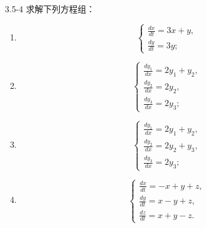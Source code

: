 \documentclass[UTF8,a4paper,11pt]{ctexart}
\begin{document}
\begin{problem}{3.5-4}
求解下列方程组：
  \begin{enumerate}[label=(\arabic*)]
    \item
    \[
    \begin{cases}
      \displaystyle \frac{dx}{dt}=3x+y,\\[5pt]
      \displaystyle \frac{dy}{dt}=3y;
    \end{cases}
    \]

    \item
    \[
    \begin{cases}
      \displaystyle \frac{dy_1}{dx}=2y_1+y_2,\\[5pt]
      \displaystyle \frac{dy_2}{dx}=2y_2,\\[5pt]
      \displaystyle \frac{dy_3}{dx}=2y_3;
    \end{cases}
    \]

    \item
    \[
    \begin{cases}
      \displaystyle \frac{dy_1}{dx}=2y_1+y_2,\\[5pt]
      \displaystyle \frac{dy_2}{dx}=2y_2+y_3,\\[5pt]
      \displaystyle \frac{dy_3}{dx}=2y_3;
    \end{cases}
    \]

    \item
    \[
    \begin{cases}
      \displaystyle \frac{dx}{dt}=-x+y+z,\\[5pt]
      \displaystyle \frac{dy}{dt}=x-y+z,\\[5pt]
      \displaystyle \frac{dz}{dt}=x+y-z.
    \end{cases}
    \]
  \end{enumerate}
\end{problem}
\end{document}
